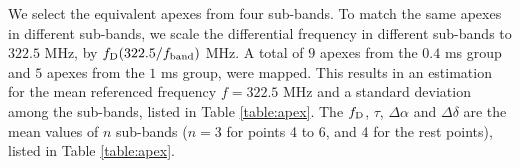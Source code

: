 \documentclass[useAMS,usenatbib]{mn2e}
\begin{document}
We select the equivalent apexes from four sub-bands. To match the same apexes in different sub-bands, we scale the differential frequency in different sub-bands to $322.5$ MHz, by $f_{\rm D} (322.5/f_{\rm band})$ MHz. A total of $9$ apexes from the $0.4$ ms group and $5$ apexes from the $1$ ms
group, were mapped. This results in an estimation
for the mean referenced frequency $f=322.5$ MHz and a standard
deviation among the sub-bands, listed in Table
\ref{table:apex}. The $f_{\rm D}$, $\tau$, $\Delta\alpha$ and $\Delta\delta$
are the mean values of $n$ sub-bands
($n=3$ for points 4 to 6, and 4 for the rest points), listed
in Table \ref{table:apex}. 
\end{document}
